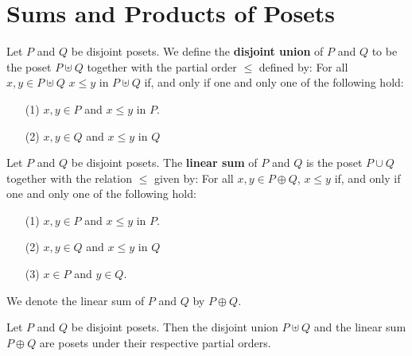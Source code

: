 \section{Sums and Products of Posets}
\label{section_1.5}

\begin{definition}
  Let $P$ and $Q$ be disjoint posets. We define the \textbf{disjoint
  union} of $P$ and $Q$ to be the poset $P \uplus Q$ together with
  the partial order $\leq$ defined by: For all $x,y \in P \uplus Q$
  $x \leq  y $ in $P \uplus Q$ if, and only if one and only one of
  the following hold:
  \begin{enumerate}
    \item[(1)] $x,y \in P$ and $x \leq y$ in $P$.

    \item[(2)] $x,y \in Q$ and $x \leq y$ in $Q$
  \end{enumerate}
\end{definition}

\begin{definition}
  Let $P$ and $Q$ be disjoint posets. The \textbf{linear sum} of $P$
  and $Q$ is the poset $P \cup Q$ together with the relation $\leq$
  given by: For all $x,y \in P \oplus Q$, $x \leq y$ if, and only if
  one and only one of the following hold:
  \begin{enumerate}
    \item[(1)] $x,y \in P$ and $x \leq y$ in $P$.

    \item[(2)] $x,y \in Q$ and $x \leq y$ in $Q$

    \item[(3)] $x \in P$ and $y \in Q$.
  \end{enumerate}
  We denote the linear sum of $P$ and $Q$ by $P \oplus Q$.
\end{definition}

\begin{proposition}\label{proposition_1.5.1}
  Let $P$ and $Q$ be disjoint posets. Then the disjoint union $P
  \uplus Q$ and the linear sum $P \oplus Q$ are posets under their
  respective partial orders.
\end{proposition}

